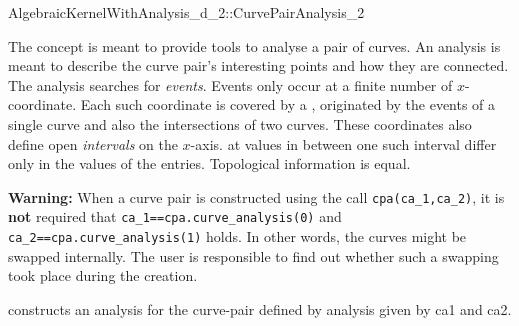 \begin{ccRefConcept}{AlgebraicKernelWithAnalysis_d_2::CurvePairAnalysis_2}

\ccDefinition

The  concept is meant to provide tools to analyse 
a pair of curves. An analysis is meant to describe the curve pair's 
interesting points and how they are connected. 
The analysis searches for {\it events}. Events only
occur at a finite number of $x$-coordinate. Each such coordinate is
covered by a , 
originated by the events of a single curve
and also the intersections of two curves.
These coordinates also define open {\it intervals}
on the $x$-axis.  
at values in between one such interval
differ only in the values of the  entries. Topological 
information is equal. 

{\bf Warning:} When a curve pair is constructed using the call
{\tt cpa(ca\_1,ca\_2)}, it is {\bf not} required that 
{\tt ca\_1==cpa.curve\_analysis(0)} and {\tt ca\_2==cpa.curve\_analysis(1)} 
holds.
In other words, the curves might be swapped internally.
The user is responsible to find out whether such a swapping took place
during the creation.


\ccTypes






\ccCreation
{}

{constructs an analysis for the curve-pair defined by analysis given by 
ca1 and ca2. 
}

\begin{ccAdvanced}


\end{ccAdvanced}
\end{ccRefConcept}

